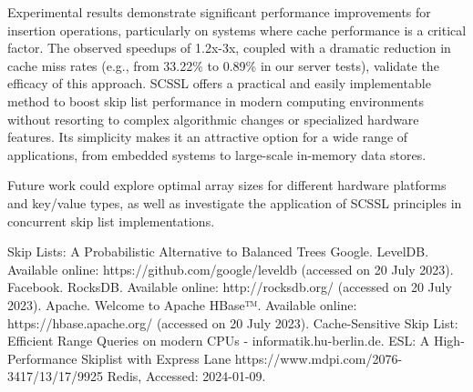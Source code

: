 \documentclass[sigconf, nonacm, letterpaper,top=2cm,bottom=2cm,left=3cm,right=3cm,marginparwidth=1.75cm]{acmart}
\begin{document}
Experimental results demonstrate significant performance improvements for insertion operations, particularly on systems where cache performance is a critical factor. The observed speedups of 1.2x-3x, coupled with a dramatic reduction in cache miss rates (e.g., from 33.22\% to 0.89\% in our server tests), validate the efficacy of this approach. SCSSL offers a practical and easily implementable method to boost skip list performance in modern computing environments without resorting to complex algorithmic changes or specialized hardware features. Its simplicity makes it an attractive option for a wide range of applications, from embedded systems to large-scale in-memory data stores.

Future work could explore optimal array sizes for different hardware platforms and key/value types, as well as investigate the application of SCSSL principles in concurrent skip list implementations.

\begin{thebibliography}{9} 
      Skip Lists: A Probabilistic Alternative to Balanced Trees
      Google. LevelDB. Available online: https://github.com/google/leveldb (accessed on 20 July 2023).
      Facebook. RocksDB. Available online: http://rocksdb.org/ (accessed on 20 July 2023).
      Apache. Welcome to Apache HBase™. Available online: https://hbase.apache.org/ (accessed on 20 July 2023).
      Cache-Sensitive Skip List: Efficient Range Queries on modern CPUs - informatik.hu-berlin.de.
      ESL: A High-Performance Skiplist with Express Lane  https://www.mdpi.com/2076-3417/13/17/9925
	Redis, Accessed: 2024-01-09.
\end{thebibliography}
\end{document}
